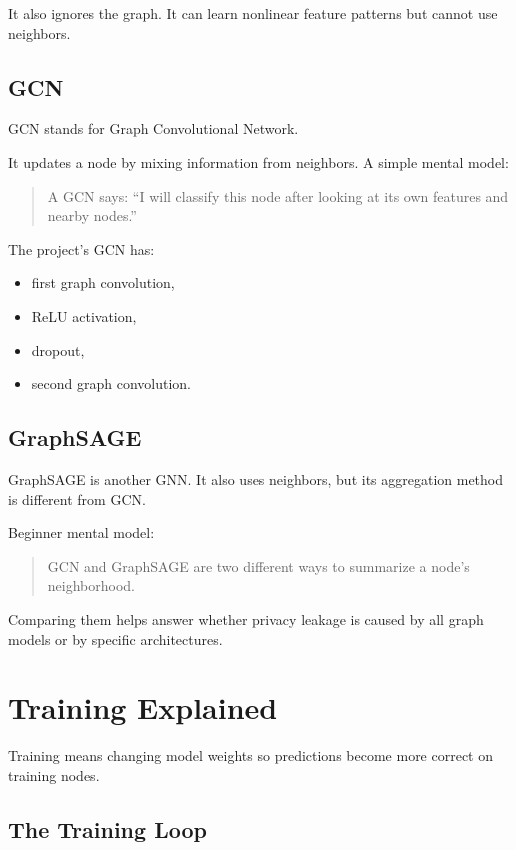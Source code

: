 \documentclass[11pt,a4paper]{article}
\begin{document}
It also ignores the graph. It can learn nonlinear feature patterns but cannot use neighbors.

\subsection{GCN}

GCN stands for Graph Convolutional Network.

It updates a node by mixing information from neighbors. A simple mental model:

\begin{quote}
A GCN says: ``I will classify this node after looking at its own features and nearby nodes.''
\end{quote}

The project's GCN has:
\begin{itemize}
  \item first graph convolution,
  \item ReLU activation,
  \item dropout,
  \item second graph convolution.
\end{itemize}

\subsection{GraphSAGE}

GraphSAGE is another GNN. It also uses neighbors, but its aggregation method is different from GCN.

Beginner mental model:

\begin{quote}
GCN and GraphSAGE are two different ways to summarize a node's neighborhood.
\end{quote}

Comparing them helps answer whether privacy leakage is caused by all graph models or by specific architectures.

\section{Training Explained}

Training means changing model weights so predictions become more correct on training nodes.

\subsection{The Training Loop}
\end{document}

